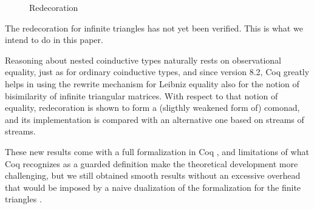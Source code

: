 \begin{figure}[h]
  \centering
  \caption{Redecoration}
  \label{fig:redecf}
\end{figure}

The redecoration for infinite
triangles \cite{grossestcspaper} has not yet been verified. This is
what we intend to do in this paper. 

Reasoning about nested coinductive types naturally rests on
observational equality, just as for ordinary coinductive types, and
since version 8.2, Coq greatly helps in using the rewrite mechanism
for Leibniz equality also for the notion of bisimilarity of infinite
triangular matrices.  With
respect to that notion of equality, redecoration is shown to form a
(sligthly weakened form of) comonad, and its implementation is
compared with an alternative one based on streams of streams.

These new results come with a full formalization in Coq \cite{TYPES11code}, and
limitations of what Coq recognizes as a guarded definition make the
theoretical development more challenging, but we still obtained smooth
results without an excessive overhead that would be imposed by a naive
dualization of the formalization for the finite triangles \cite{types07}.

